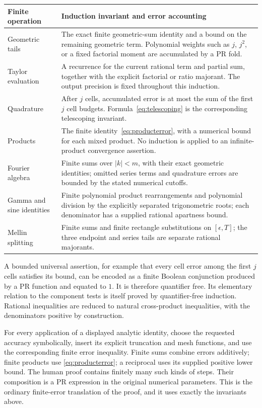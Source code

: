 \documentclass[11pt,letterpaper]{article}
\numberwithin{equation}{section}
\theoremstyle{definition}
\begin{document}
\begin{longtable}{p{}p{}}
\toprule
Finite operation & Induction invariant and error accounting\\
\midrule
\endhead
Geometric tails &
The exact finite geometric-sum identity and a bound on the remaining
geometric term. Polynomial weights such as \(j\), \(j^2\), or a
fixed factorial moment are accumulated by a PR fold.\\
Taylor evaluation &
A recurrence for the current rational term and partial sum, together
with the explicit factorial or ratio majorant. The output precision
is fixed throughout this induction.\\
Quadrature &
After \(j\) cells, accumulated error is at most the sum of the first
\(j\) cell budgets. Formula~\eqref{eq:telescoping} is the corresponding
telescoping invariant.\\
Products &
The finite identity~\eqref{eq:producterror}, with a numerical bound
for each mixed product. No induction is applied to an infinite-product
convergence assertion.\\
Fourier algebra &
Finite sums over \(|k|<m\), with their exact geometric identities;
omitted series terms and quadrature errors are bounded by the stated
numerical cutoffs.\\
Gamma and sine identities &
Finite polynomial product rearrangements and polynomial division by
the explicitly separated trigonometric roots; each denominator has
a supplied rational apartness bound.\\
Mellin splitting &
Finite sums and finite rectangle substitutions on
\([\epsilon,T]\); the three endpoint and series tails are
separate rational majorants.\\
\bottomrule
\end{longtable}

A bounded universal assertion, for example that every cell error
among the first \(j\) cells satisfies its bound, can be encoded as
a finite Boolean conjunction produced by a PR function and equated
to \(1\). It is therefore quantifier free. Its elementary relation
to the component tests is itself proved by quantifier-free induction.
Rational inequalities are reduced to natural cross-product
inequalities, with the denominators positive by construction.

For every application of a displayed analytic identity, choose the
requested accuracy symbolically, insert its explicit truncation and
mesh functions, and use the corresponding finite error inequality.
Finite sums combine errors additively; finite products use
\eqref{eq:producterror}; a reciprocal uses its supplied positive
lower bound. The human proof contains finitely many such kinds of
steps. Their composition is a PR expression in the original
numerical parameters. This is the ordinary finite-error
translation of the proof, and it uses exactly the invariants above.
\end{document}
